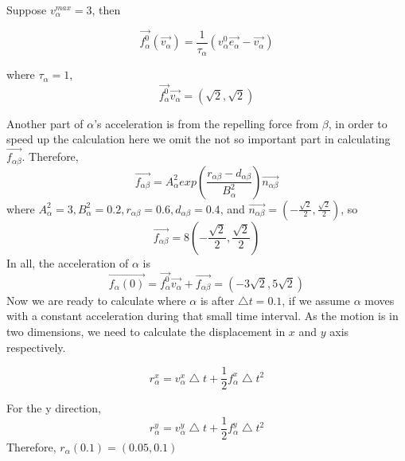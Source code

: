 Suppose $v_{\alpha}^{max}=3$, then 

 \begin{equation}
 	\vec{f^{0}_{\alpha}} \left( \vec{v_{\alpha}} \right) 
= 	\frac{1}{\tau_{\alpha}} \left( v^{0}_{\alpha} 
	\vec{e_{\alpha}} - \vec{v_{\alpha}} \right)
 \end{equation}
 
where $\tau_{\alpha}=1$,
 \begin{equation}
 \overrightarrow{f^{0}_{\alpha}}\overrightarrow{v_{\alpha}} = (\sqrt{2}, \sqrt{2})
 \end{equation}

Another part of $\alpha$'s acceleration is from the repelling force from $\beta$, in order to speed  up the calculation here we omit the not so important part in calculating $\overrightarrow{f_{\alpha \beta}}$.
Therefore,
 \begin{equation}
 \overrightarrow{f_{\alpha \beta}} = A^{2}_{\alpha} exp(\frac{r_{\alpha\beta}-d_{\alpha\beta}}{B^{2}_{\alpha}})\overrightarrow{n_{\alpha \beta}}
 \end{equation}
where $A^{2}_{\alpha}=3, B^{2}_{\alpha}=0.2, r_{\alpha\beta}=0.6, d_{\alpha\beta}=0.4$, and $\overrightarrow{n_{\alpha \beta}}=(-\frac{\sqrt{2}}{2}, \frac{\sqrt{2}}{2})$,
so 
 \begin{equation}
 \overrightarrow{f_{\alpha \beta}} = 8(-\frac{\sqrt{2}}{2}, \frac{\sqrt{2}}{2})
 \end{equation}
In all, the acceleration of $\alpha$ is 
 \begin{equation}
 \overrightarrow{f_{\alpha}(0)} = \overrightarrow{f^{0}_{\alpha}}\overrightarrow{v_{\alpha}} + \overrightarrow{f_{\alpha\beta}} = (-3\sqrt{2}, 5\sqrt{2})
 \end{equation}
Now we are ready to calculate where $\alpha$ is after $\bigtriangleup t=0.1$, if we assume $\alpha$ moves with a constant acceleration during that small time interval.
As the motion is in two dimensions, we need to calculate the displacement in $x$ and $y$ axis respectively.

 \begin{equation}
 r^{x}_{\alpha} = v^{x}_{\alpha} \bigtriangleup t + \frac{1}{2} f^{x}_{\alpha} \bigtriangleup t ^{2}
 \end{equation}
 
 For the y direction,
  \begin{equation}
 r^{y}_{\alpha} = v^{y}_{\alpha} \bigtriangleup t + \frac{1}{2} f^{y}_{\alpha} \bigtriangleup t ^{2}
 \end{equation}
 Therefore, $r_{\alpha}(0.1)= (0.05, 0.1)$